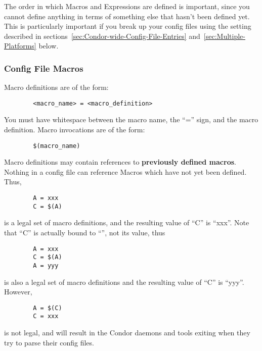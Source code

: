 The order in which Macros and Expressions are defined is important,
since you cannot define anything in terms of something else that
hasn't been defined yet.  This is particularly important if you break
up your config files using the  setting
described in sections~\ref{sec:Condor-wide-Config-File-Entries}
and~\ref{sec:Multiple-Platforms} below.

\subsubsection{Config File Macros}
\label{sec:Config-File-Macros}

Macro definitions are of the form:

\begin{verbatim}
        <macro_name> = <macro_definition>
\end{verbatim}

\Note You must have whitespace between the macro name, the
``='' sign, and the macro definition.  Macro invocations are of the
form: 

\begin{verbatim}
        $(macro_name)
\end{verbatim}

Macro definitions may contain references to \textbf{previously defined
  macros}.  Nothing in a config file can reference Macros which have
  not yet been defined.  Thus,

\begin{verbatim}
        A = xxx
        C = $(A) 
\end{verbatim}

is a legal set of macro definitions, and the resulting value of ``C'' is
``xxx''.  Note that ``C'' is actually bound to ``'', not its value, thus

\begin{verbatim}
        A = xxx
        C = $(A)
        A = yyy
\end{verbatim}

is also a legal set of macro definitions and the resulting value of
``C'' is ``yyy''.  However, 

\begin{verbatim}
        A = $(C)
        C = xxx
\end{verbatim}

is not legal, and will result in the Condor daemons and tools exiting
when they try to parse their config files.

